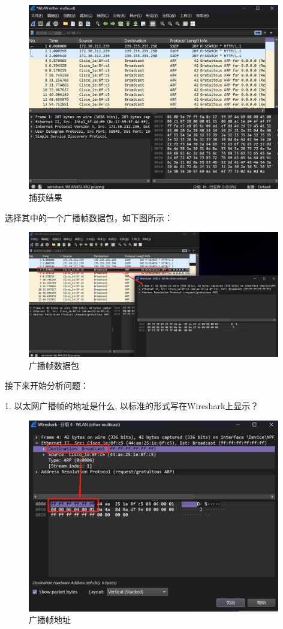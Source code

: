 \documentclass{article}
\begin{document}
	\begin{figure}[H]
		\centering
		\includegraphics[width=11cm]{images/15.捕获结果.png}
		\caption{捕获结果}
	\end{figure}
	
	选择其中的一个广播帧数据包，如下图所示：
	
	\begin{figure}[H]
		\centering
		\includegraphics[width=11cm]{images/16.广播帧数据包.png}
		\caption{广播帧数据包}
	\end{figure}
	
	接下来开始分析问题：
	
	1. 以太网广播帧的地址是什么, 以标准的形式写在Wireshark上显示？
	
	\begin{figure}[H]
		\centering
		\includegraphics[width=11cm]{images/17.广播帧地址.png}
		\caption{广播帧地址}
	\end{figure}
	
\end{document}
